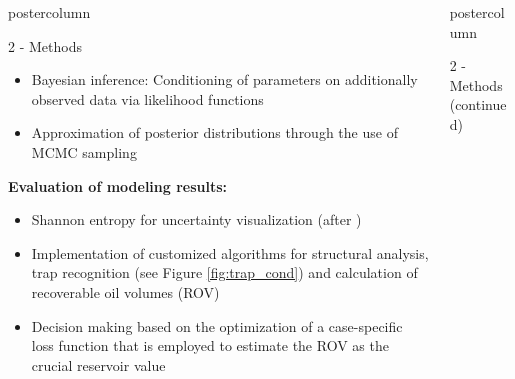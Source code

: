 \documentclass{beamer}
\newlength{\columnheight}
\begin{document}
\begin{frame}
\begin{columns}
\begin{column}{.249\textwidth}
\begin{beamercolorbox}[center]{postercolumn}
\begin{minipage}{.98\textwidth}
{\begin{myblock}{2 - Methods}
\begin{itemize}
	\item Bayesian inference: Conditioning of parameters on additionally observed data via likelihood functions
	\item Approximation of posterior distributions through the use of MCMC sampling
	\end{itemize}
\textbf{Evaluation of modeling results:}
										\begin{itemize}
										\item Shannon entropy for uncertainty visualization (after \citet{wellmann2012uncertainties})
										\item Implementation of customized algorithms for structural analysis, trap recognition (see Figure \ref{fig:trap_cond}) and calculation of recoverable oil volumes (ROV)
										\item Decision making based on the optimization of a case-specific loss function that is employed to estimate the ROV as the crucial reservoir value %
										\end{itemize}
										
	\vspace{0.1em}
						
\end{myblock}\vfill
					
					
		}\end{minipage}\end{beamercolorbox}
	\end{column}



\begin{column}{.499\textwidth}
	\begin{beamercolorbox}[center]{postercolumn}
		\begin{minipage}{.98\textwidth} %
				\parbox[t][\columnheight]{\textwidth}{ %
					
\begin{myblock}{2 - Methods (continued)}
\vspace{0.5em}
	

\end{myblock}}
\end{minipage}
\end{beamercolorbox}
\end{column}
\end{columns}
\end{frame}
\end{document}

